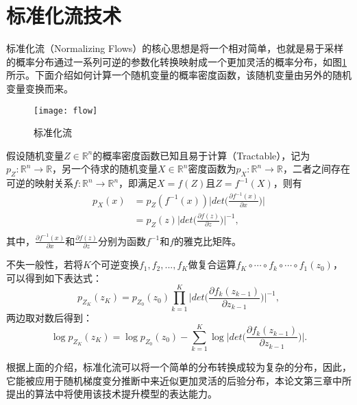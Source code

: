 \section{标准化流技术}
标准化流（Normalizing Flows）的核心思想是将一个相对简单，也就是易于采样的概率分布通过一系列可逆的参数化转换映射成一个更加灵活的概率分布，如图\ref{normal_flow}所示。下面介绍如何计算一个随机变量的概率密度函数，该随机变量由另外的随机变量变换而来。

\begin{figure}[htbp]
\centering
\texttt{[image: flow]}
\vspace{1em}
\caption{标准化流 \label{normal_flow}}
\end{figure}

假设随机变量$Z \in \mathbb{R}^n$的概率密度函数已知且易于计算（Tractable），记为$p_Z: \mathbb{R}^n \rightarrow \mathbb{R}$，另一个待求的随机变量$X \in \mathbb{R}^n$密度函数为$p_X: \mathbb{R}^n \rightarrow \mathbb{R}$，二者之间存在可逆的映射关系$f:\mathbb{R}^n \rightarrow \mathbb{R}^n$，即满足$X=f(Z)$且$Z=f^{-1}(X)$，则有
\begin{equation}
\begin{split}
	p_X(x) & = p_Z(f^{-1}(x))\bigg | det\bigg (\frac{\partial f^{-1}(x)}{\partial x}\bigg )\bigg | \\
	& = p_Z(z)\bigg | det\bigg (\frac{\partial f(z)}{\partial z}\bigg )\bigg |^{-1}, \\
\end{split}
\end{equation}
其中，$\frac{\partial f^{-1}(x)}{\partial x}$和$\frac{\partial f(z)}{\partial z}$分别为函数$f^{-1}$和$f$的雅克比矩阵。

不失一般性，若将$K$个可逆变换$f_1, f_2, ...,f_{K}$做复合运算$f_{K} \circ \cdots \circ f_{k}\circ \cdots \circ f_{1}(z_{0})$，可以得到如下表达式：
\begin{equation}
	p_{Z_K}(z_K) = p_{Z_0}(z_0)\prod_{k=1}^{K}\bigg | det\bigg (\frac{\partial f_{k}(z_{k-1})}{\partial z_{k-1}}\bigg )\bigg |^{-1},
\end{equation}
两边取对数后得到：
\begin{equation}
	\log p_{Z_K}(z_K) = \log p_{Z_0}(z_0) - \sum_{k=1}^{K}\log \bigg | det\bigg (\frac{\partial f_{k}(z_{k-1})}{\partial z_{k-1}}\bigg )\bigg |.\label{nf_func}
\end{equation}

根据上面的介绍，标准化流可以将一个简单的分布转换成较为复杂的分布，因此，它能被应用于随机梯度变分推断中来近似更加灵活的后验分布\cite{rezende2015variational}，本论文第三章中所提出的算法中将使用该技术提升模型的表达能力。

